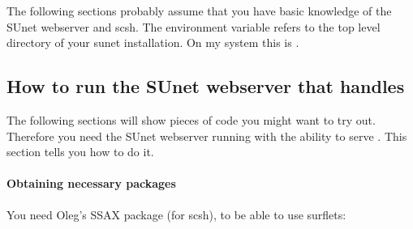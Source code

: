 The following sections probably assume that you have basic knowledge
of the SUnet webserver and scsh.  The environment variable
 refers to the top level directory of your sunet
installation.  On my system this is .

\subsection{How to run the SUnet webserver that handles \surflets}

The following sections will show pieces of \surflet code you might
want to try out.  Therefore you need the SUnet webserver running with
the ability to serve \surflets.  This section tells you how to do it.

\paragraph{Obtaining necessary packages} You need Oleg's SSAX package
(for scsh), to be able to use surflets:

